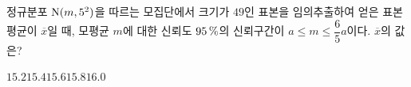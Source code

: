 정규분포 $\mathrm{N}(m{,}\mkern3mu\mathopen{}5^2)$을 따르는 모집단에서 크기가 $49$인 표본을 임의추출하여 얻은 표본평균이 $\overline{x}$일 때, 모평균 $m$에 대한 신뢰도 $95\mkern3mu \%$의 신뢰구간이 $a\le m\le\dfrac{6}{5}a$이다. $\overline{x}$의 값은? 
\begin{choices32}{$15.2$}{$15.4$}{$15.6$}{$15.8$}{$16.0$}\end{choices32}
